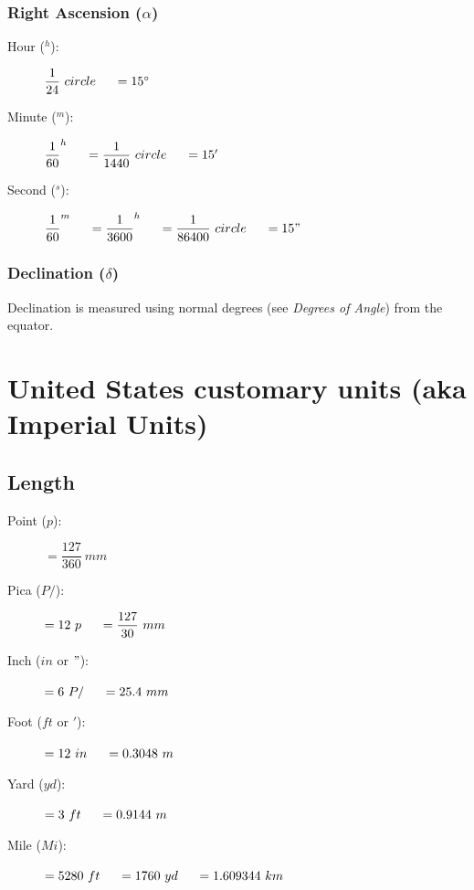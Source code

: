 \documentclass[]{report}
\newcommand \tab[1][1cm]{\hspace*{#1}}
\newcommand{\degrees}{^{\circ}}
\begin{document}
\subsubsection{Right Ascension ($\alpha$)}

\begin{description}
\item[Hour ($^h$):] \( \dfrac{1}{24}\ circle \tab[0.5cm]= 15 \degrees \)
\item[Minute ($^m$):] \( \dfrac{1}{60} ^h \tab[0.5cm]= \dfrac{1}{1440}\ circle \tab[0.5cm]= 15' \)
\item[Second ($^s$):] \( \dfrac{1}{60} ^m \tab[0.5cm]= \dfrac{1}{3600} ^h \tab[0.5cm]= \dfrac{1}{86400}\ circle \tab[0.5cm]= 15" \) 

\end{description}

\subsubsection{Declination ($\delta$)}
Declination is measured using normal degrees (see \textit{Degrees of Angle}) from the equator.


\section{United States customary units (aka Imperial Units)}

\subsection{Length}
\begin{description}
\item[Point ($p$):]$ = \dfrac{127}{360}\ mm$

\item[Pica ($P/$):]$ = 12\ p \tab[0.5cm]= \dfrac{127}{30}\ mm$

\item[Inch ($in$ or $"$):]$ = 6\ P/  \tab[0.5cm]= 25.4\ mm$

\item[Foot ($ft$ or $'$):]$ = 12\ in \tab[0.5cm]= 0.3048\ m$

\item[Yard ($yd$):]$ = 3\ ft \tab[0.5cm]= 0.9144\ m$

\item[Mile ($Mi$):]$ = 5280\ ft \tab[0.5cm] = 1760\ yd \tab[0.5cm] = 1.609344\ km $
\end{description}
\end{document}
